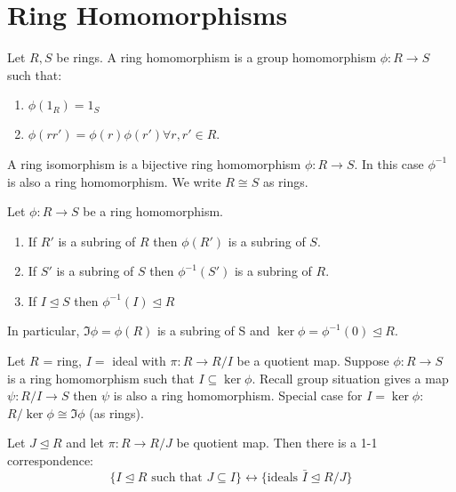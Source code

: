 \section{Ring Homomorphisms}

\begin{prop-defn}[Homomorphism]
Let \(R, S\) be rings. A ring homomorphism is a group homomorphism \(\phi: R \to S\) such that:
\begin{enumerate}
    \item \(\phi(1_R) = 1_S\)
    \item \(\phi(rr') = \phi(r)\phi(r') \forall r, r' \in R\).
\end{enumerate}
\end{prop-defn}

\begin{definition}[Isomorphism]
    A ring isomorphism is a bijective ring homomorphism \(\phi: R \to S\). In this case \(\phi^{-1}\) is also a ring homomorphism. We write \(R \cong S\) as rings.
\end{definition}

\begin{proposition}
    Let \(\phi: R \to S\) be a ring homomorphism.
    \begin{enumerate}
        \item If \(R'\) is a subring of \(R\) then \(\phi(R')\) is a subring of \(S\).
        \item If \(S'\) is a subring of \(S\) then \(\phi^{-1}(S')\) is a subring of \(R\).
        \item If \(I \trianglelefteq S\) then \(\phi^{-1}(I) \trianglelefteq R\)
    \end{enumerate}
\end{proposition}

\begin{corollary}
    In particular, \(\Im \phi = \phi(R)\) is a subring of S and \(\ker \phi = \phi^{-1}(0) \trianglelefteq R\).
\end{corollary}

\begin{theorem}
    Let \(R \) = ring, \(I = \) ideal with \(\pi: R \to R / I\) be a quotient map. Suppose \(\phi: R \to S\) is a ring homomorphism such that \(I \subseteq \ker \phi\). Recall group situation gives a map \(\psi: R / I \to S\) then \(\psi\) is also a ring homomorphism. Special case for \(I = \ker \phi\): \(R / \ker\phi \cong \Im \phi\) (as rings).
\end{theorem}

\begin{proposition}
    Let \(J \trianglelefteq R\) and let \(\pi: R \to R / J\) be quotient map. Then there is a 1-1 correspondence:
    \[\{I \trianglelefteq R \text{ such that } J \subseteq I \} \leftrightarrow	\{\text{ideals } \bar{I} \trianglelefteq R / J\}\]
\end{proposition}

